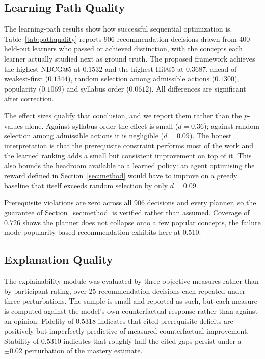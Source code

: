 \subsection{Learning Path Quality}

The learning-path results show how successful sequential optimization is.
Table~\ref{tab:pathquality} reports 906 recommendation decisions drawn from 400 held-out
learners who passed or achieved distinction, with the concepts each learner actually
studied next as ground truth. The proposed framework achieves the highest NDCG@5 at
$0.1532$ and the highest Hit@5 at $0.3687$, ahead of weakest-first ($0.1344$), random
selection among admissible actions ($0.1300$), popularity ($0.1069$) and syllabus order
($0.0612$). All differences are significant after correction.

The effect sizes qualify that conclusion, and we report them rather than the $p$-values
alone. Against syllabus order the effect is small ($d = 0.36$); against random selection
among admissible actions it is negligible ($d = 0.09$). The honest interpretation is that
the prerequisite constraint performs most of the work and the learned ranking adds a small
but consistent improvement on top of it. This also bounds the headroom available to a
learned policy: an agent optimising the reward defined in Section~\ref{sec:method} would
have to improve on a greedy baseline that itself exceeds random selection by only
$d = 0.09$.

Prerequisite violations are zero across all 906 decisions and every planner, so the
guarantee of Section~\ref{sec:method} is verified rather than assumed. Coverage of $0.726$
shows the planner does not collapse onto a few popular concepts, the failure mode
popularity-based recommendation exhibits here at $0.510$.

\subsection{Explanation Quality}

The explainability module was evaluated by three objective measures rather than by
participant rating, over 25 recommendation decisions each repeated under three
perturbations. The sample is small and reported as such, but each measure is computed
against the model's own counterfactual response rather than against an opinion. Fidelity of $0.5318$ indicates that cited prerequisite deficits are positively but
imperfectly predictive of measured counterfactual improvement. Stability of $0.5310$
indicates that roughly half the cited gaps persist under a $\pm 0.02$ perturbation of the
mastery estimate.

